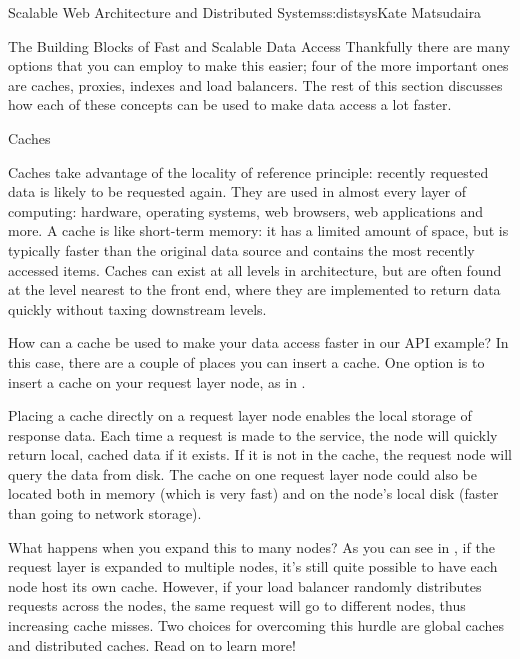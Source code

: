 \begin{aosachapter}{Scalable Web Architecture and Distributed Systems}{s:distsys}{Kate Matsudaira}
\begin{aosasect1}{The Building Blocks of Fast and Scalable Data Access}
Thankfully there are many options that you can employ to make this
easier; four of the more important ones are caches, proxies,
indexes and load balancers. The rest of this section 
discusses how each of these concepts can be used to make data
access a lot faster.

\begin{aosasect2}{Caches}

Caches take advantage of the locality of reference
principle: recently requested data is likely to be requested
again. They are used in almost every layer of computing:
hardware, operating systems, web browsers, web applications and
more. A cache is like short-term memory: it has a limited amount of
space, but is typically faster than the original data source and
contains the most recently accessed items. Caches can exist at all
levels in architecture, but are often found at the level nearest
to the front end, where they are implemented to return data
quickly without taxing downstream levels.

How can a cache be used to make your data access faster in our API example?  
In this case, there are a couple of places you can insert a cache.  One 
option is to insert a cache on your request layer node, as in
.


Placing a cache directly on a request layer node enables the local
storage of response data. Each time a request is made to the service,
the node will quickly return local, cached data if it exists. If it
is not in the cache, the request node will query the data from disk. The
cache on one request layer node could also be located both in memory
(which is very fast) and on the node's local disk (faster than going
to network storage).



What happens when you expand this to many nodes?
As you can see in , if the request layer is expanded to multiple nodes, it's still quite
possible to have each node host its own cache. However, if your load
balancer randomly distributes requests across the nodes, the same
request will go to different nodes, thus increasing cache misses. Two
choices for overcoming this hurdle are global caches and distributed
caches. Read on to learn more!

\end{aosasect2}


\end{aosasect1}
\end{aosachapter}
